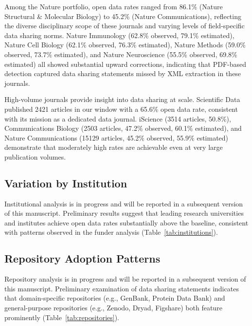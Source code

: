 Among the Nature portfolio, open data rates ranged from 86.1\% (Nature Structural \& Molecular Biology) to 45.2\% (Nature Communications), reflecting the diverse disciplinary scope of these journals and varying levels of field-specific data sharing norms. Nature Immunology (62.8\% observed, 79.1\% estimated), Nature Cell Biology (62.1\% observed, 76.3\% estimated), Nature Methods (59.0\% observed, 73.7\% estimated), and Nature Neuroscience (55.5\% observed, 69.8\% estimated) all showed substantial upward corrections, indicating that PDF-based detection captured data sharing statements missed by XML extraction in these journals.

High-volume journals provide insight into data sharing at scale. Scientific Data published \num{2421} articles in our window with a 65.6\% open data rate, consistent with its mission as a dedicated data journal. iScience (\num{3514} articles, 50.8\%), Communications Biology (\num{2503} articles, 47.2\% observed, 60.1\% estimated), and Nature Communications (\num{15129} articles, 45.2\% observed, 55.9\% estimated) demonstrate that moderately high rates are achievable even at very large publication volumes.

\subsection{Variation by Institution}

Institutional analysis is in progress and will be reported in a subsequent version of this manuscript. Preliminary results suggest that leading research universities and institutes achieve open data rates substantially above the baseline, consistent with patterns observed in the funder analysis (Table~\ref{tab:institutions}).

\subsection{Repository Adoption Patterns}

Repository analysis is in progress and will be reported in a subsequent version of this manuscript. Preliminary examination of data sharing statements indicates that domain-specific repositories (e.g., GenBank, Protein Data Bank) and general-purpose repositories (e.g., Zenodo, Dryad, Figshare) both feature prominently (Table~\ref{tab:repositories}).

